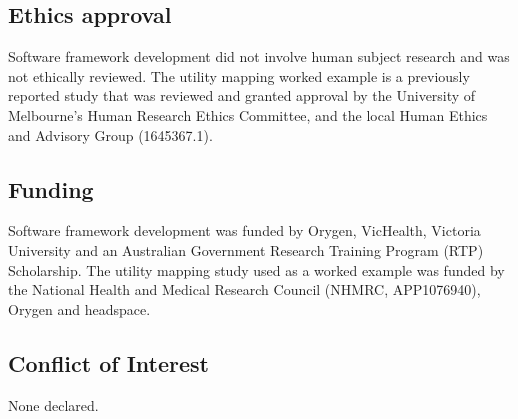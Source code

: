 \documentclass[sn-vancouver,Numbered,pdflatex]{sn-jnl}
\theoremstyle{remark}
\theoremstyle{definition}
\begin{document}
\hypertarget{ethics-approval}{%
\subsection*{Ethics approval}\label{ethics-approval}}

Software framework development did not involve human subject research and was not ethically reviewed. The utility mapping worked example is a previously reported study that was reviewed and granted approval by the University of Melbourne's Human Research Ethics Committee, and the local Human Ethics and Advisory Group (1645367.1).

\hypertarget{funding}{%
\subsection*{Funding}\label{funding}}

Software framework development was funded by Orygen, VicHealth, Victoria University and an Australian Government Research Training Program (RTP) Scholarship. The utility mapping study used as a worked example was funded by the National Health and Medical Research Council (NHMRC, APP1076940), Orygen and headspace.

\hypertarget{conflict-of-interest}{%
\subsection*{Conflict of Interest}\label{conflict-of-interest}}

None declared.

\newpage
\appendix
{}


\end{document}
